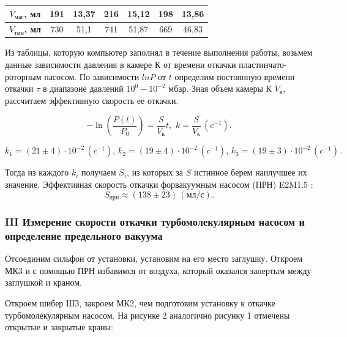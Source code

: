 \documentclass[a4paper, fontsize = 14pt]{article}
\begin{document}
\begin{table}[htb]
\begin{tabular}{|c|c|c|c|c|c|c|}
\textbf{$V_{маг}$, мл}                                                                                    & 191        & 13,37                   & 216        & 15,12                   & 198        & 13,86                   \\ \hline
\textbf{$V_{тмн}$, мл}                                                                                    & 730        & 51,1                    & 741        & 51,87                   & 669        & 46,83                   \\ \hline
\end{tabular}
\end{table}
Из таблицы, которую компьютер заполнял в течение выполнения работы, возьмем данные зависимости давления в камере К от времени откачки пластинчато-роторным насосом. По зависимости $ln{P}$ от $t$ определим постоянную времени откачки $\tau$ в диапазоне давлений $10^0-10^{-2}$ мбар. Зная объем камеры К $V_{к}$, рассчитаем эффективную скорость ее откачки.

\begin{equation}
-\ln{(\frac{P(t)}{P_0})}=\frac{S}{V_к} t, \, \, k = \frac{S}{V_к} \, (c^{-1}).
\end{equation}

\[ k_1 = (21\pm4)\cdot10^{-2} \, (c^{-1}), \, k_2 = (19\pm4)\cdot10^{-2} \, (c^{-1}), \, k_3 = (19\pm3)\cdot10^{-2} \, (c^{-1}) \,. \]

Тогда из каждого $k_i$ получаем $S_i$, из которых за $S$ истинное берем наилучшее их значение. Эффективная скорость откачки форвакуумным насосом (ПРН) E2M1.5 : 
\[ S_{прн} \approx (138\pm23) \, (мл/с). \]


\subsubsection*{III Измерение скорости откачки турбомолекулярным насосом и определение предельного вакуума}

Отсоединим сильфон от установки, установим на его место заглушку. Откроем МК3 и с помощью ПРН избавимся от воздуха, который оказался запертым между заглушкой и краном. 

Откроем шибер ШЗ, закроем МК2, чем подготовим установку к откачке турбомолекулярным насосом. На рисунке 2 аналогично рисунку 1 отмечены открытые и закрытые краны:
\end{document}
